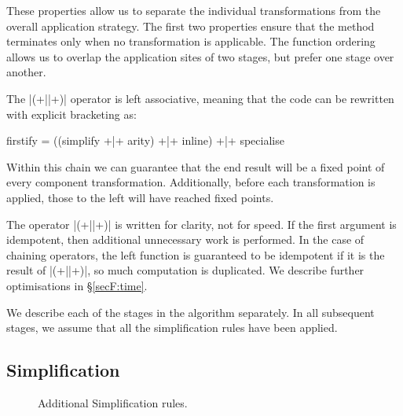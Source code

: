 These properties allow us to separate the individual transformations from the overall application strategy. The first two properties ensure that the method terminates only when no transformation is applicable. The function ordering allows us to overlap the application sites of two stages, but prefer one stage over another.

The |(+||+)| operator is left associative, meaning that the code can be rewritten with explicit bracketing as:

\begin{code}
firstify = ((simplify +|+ arity) +|+ inline) +|+ specialise
\end{code}

Within this chain we can guarantee that the end result will be a fixed point of every component transformation. Additionally, before each transformation is applied, those to the left will have reached fixed points.

The operator |(+||+)| is written for clarity, not for speed. If the first argument is idempotent, then additional unnecessary work is performed. In the case of chaining operators, the left function is guaranteed to be idempotent if it is the result of |(+||+)|, so much computation is duplicated. We describe further optimisations in \S\ref{secF:time}.

We describe each of the stages in the algorithm separately. In all subsequent stages, we assume that all the simplification rules have been applied.


\subsection{Simplification}

\begin{figure}
\begin{simplify}





\end{simplify}
\caption{Additional Simplification rules.}
\label{figF:lambda_simplify}
\end{figure}

